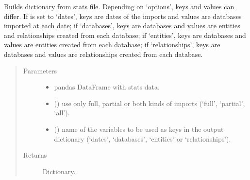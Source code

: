 \documentclass[letterpaper,10pt,english]{sphinxmanual}
\begin{document}

\begin{fulllineitems}
\label{\detokenize{_autosummary/report_manager.apps:report_manager.apps.imports.get_databases_entities_relationships}}
Builds dictionary from stats file. Depending on ‘options’, keys and values can differ.     If  is set to ‘dates’, keys are dates of the imports and values are databases imported at each date;     if ‘databases’, keys are databases and values are entities and relationships created from each database;     if ‘entities’, keys are databases and values are entities created from each database;     if ‘relationships’, keys are databases and values are relationships created from each database.
\begin{quote}\begin{description}
\item[{Parameters}] \leavevmode\begin{itemize}
\item {} 
 \textendash{} pandas DataFrame with stats data.

\item {} 
 () \textendash{} use only full, partial or both kinds of imports (‘full’, ‘partial’, ‘all’).

\item {} 
 () \textendash{} name of the variables to be used as keys in the output dictionary (‘dates’,                         ‘databases’, ‘entities’ or ‘relationships’).

\end{itemize}

\item[{Returns}] \leavevmode
Dictionary.

\end{description}\end{quote}

\end{fulllineitems}
\end{document}
